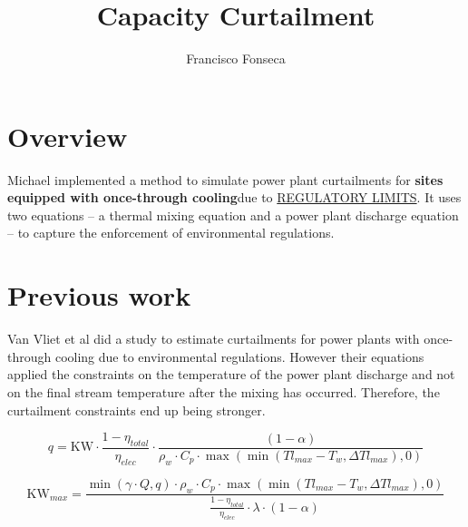 \documentclass[11pt, oneside]{article}   	%
\title{Capacity Curtailment}
\author{Francisco Fonseca}
\begin{document}
\maketitle

\tableofcontents

\newpage

\newpage
\section{Overview}

Michael implemented a method to simulate power plant curtailments for \textbf{sites equipped with once-through cooling}\footnotemark due to \underline{REGULATORY LIMITS}. It uses two equations --  a thermal mixing equation and a power plant discharge equation -- to capture the enforcement of environmental regulations.


\section{Previous work}

Van Vliet et al did a study to estimate curtailments for power plants with once-through cooling due to environmental regulations. However their equations applied the constraints on the temperature of the power plant discharge and not on the final stream temperature after the mixing has occurred. Therefore, the curtailment constraints end up being stronger. 

\begin{equation}
q = \text{KW}\cdot\frac{1-\eta_{total}}{\eta_{elec}}\cdot\frac{(1-\alpha)}{\rho_w\cdot C_p\cdot\max{(\min{(Tl_{max} - T_w, \Delta Tl_{max})}, 0)}}
\end{equation}

\begin{equation}
\text{KW}_{max} = \frac{\min{(\gamma\cdot Q, q)} \cdot \rho_w\cdot C_p\cdot\max{(\min{(Tl_{max} - T_w, \Delta Tl_{max})}, 0)}}{\frac{1-\eta_{total}}{\eta_{elec}}\cdot \lambda \cdot(1-\alpha)}
\end{equation}
\end{document}

